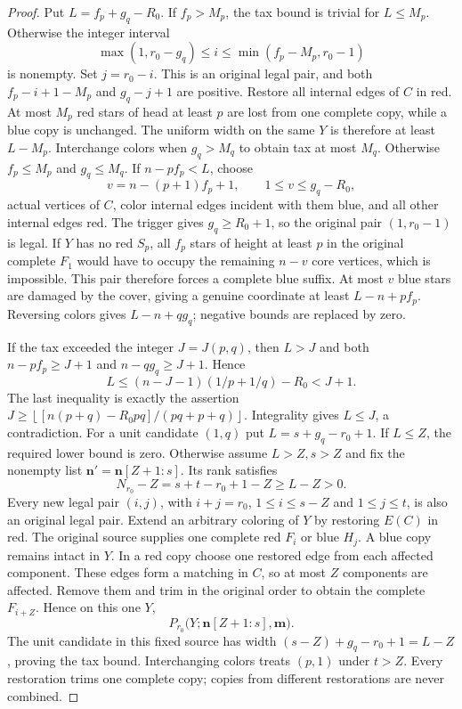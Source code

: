 \documentclass[11pt,a4paper]{article}
\newcommand{\nn}{\mathbf n}\newcommand{\mm}{\mathbf m}
\newcommand{\floor}[1]{\left\lfloor#1\right\rfloor}
\theoremstyle{definition}
\begin{document}
\begin{proof}
Put $L=f_p+g_q-R_0$. If $f_p>M_p$, the tax bound is trivial for $L\le M_p$. Otherwise the integer interval
\[
\max(1,r_0-g_q)\le i\le\min(f_p-M_p,r_0-1)
\]
is nonempty. Set $j=r_0-i$. This is an original legal pair, and both $f_p-i+1-M_p$ and $g_q-j+1$ are positive. Restore all internal edges of $C$ in red. At most $M_p$ red stars of head at least $p$ are lost from one complete copy, while a blue copy is unchanged. The uniform width on the same $Y$ is therefore at least $L-M_p$. Interchange colors when $g_q>M_q$ to obtain tax at most $M_q$. Otherwise $f_p\le M_p$ and $g_q\le M_q$. If $n-pf_p<L$, choose
\[
v=n-(p+1)f_p+1,\qquad1\le v\le g_q-R_0,
\]
actual vertices of $C$, color internal edges incident with them blue, and all other internal edges red. The trigger gives $g_q\ge R_0+1$, so the original pair $(1,r_0-1)$ is legal. If $Y$ has no red $S_p$, all $f_p$ stars of height at least $p$ in the original complete $F_1$ would have to occupy the remaining $n-v$ core vertices, which is impossible. This pair therefore forces a complete blue suffix. At most $v$ blue stars are damaged by the cover, giving a genuine coordinate at least $L-n+pf_p$. Reversing colors gives $L-n+qg_q$; negative bounds are replaced by zero.

If the tax exceeded the integer $J=J(p,q)$, then $L>J$ and both $n-pf_p\ge J+1$ and $n-qg_q\ge J+1$. Hence
\[
L\le(n-J-1)(1/p+1/q)-R_0<J+1.
\]
The last inequality is exactly the assertion $J\ge\floor{[n(p+q)-R_0pq]/(pq+p+q)}$. Integrality gives $L\le J$, a contradiction. For a unit candidate $(1,q)$ put $L=s+g_q-r_0+1$. If $L\le Z$, the required lower bound is zero. Otherwise assume $L>Z,s>Z$ and fix the nonempty list $\nn'=\nn[Z+1:s]$. Its rank satisfies
\[
N_{r_0}-Z=s+t-r_0+1-Z\ge L-Z>0.
\]
Every new legal pair $(i,j)$, with $i+j=r_0$, $1\le i\le s-Z$ and $1\le j\le t$, is also an original legal pair. Extend an arbitrary coloring of $Y$ by restoring $E(C)$ in red. The original source supplies one complete red $F_i$ or blue $H_j$. A blue copy remains intact in $Y$. In a red copy choose one restored edge from each affected component. These edges form a matching in $C$, so at most $Z$ components are affected. Remove them and trim in the original order to obtain the complete $F_{i+Z}$. Hence on this one $Y$,
\[
P_{r_0}\bigl(Y;\nn[Z+1:s],\mm\bigr).
\]
The unit candidate in this fixed source has width $(s-Z)+g_q-r_0+1=L-Z$, proving the tax bound. Interchanging colors treats $(p,1)$ under $t>Z$. Every restoration trims one complete copy; copies from different restorations are never combined.
\end{proof}
\end{document}
